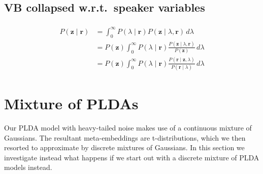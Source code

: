 \documentclass[a4paper,oneside,12pt,english]{report}
\def\zvec{\mathbf{z}}
\def\rvec{\mathbf{r}}
\begin{document}
\subsection{VB collapsed w.r.t.\ speaker variables}
\begin{align}
\begin{split}
P(\zvec\mid\rvec) &= \int_0^\infty P(\lambda\mid \rvec) P(\zvec\mid\lambda,\rvec)\,d\lambda \\
&= P(\zvec) \int_0^\infty P(\lambda\mid \rvec) \frac{P(\zvec\mid\lambda,\rvec)}{P(\zvec)}\,d\lambda \\
&= P(\zvec) \int_0^\infty P(\lambda\mid \rvec) \frac{P(\rvec\mid\zvec,\lambda)}{P(\rvec\mid\lambda)}\,d\lambda 
\end{split}
\end{align}




\section{Mixture of PLDAs}
Our PLDA model with heavy-tailed noise makes use of a continuous mixture of Gaussians. The resultant meta-embeddings are t-distributions, which we then resorted to approximate by discrete mixtures of Gaussians. In this section we investigate instead what happens if we start out with a discrete mixture of PLDA models instead. 
\end{document}
